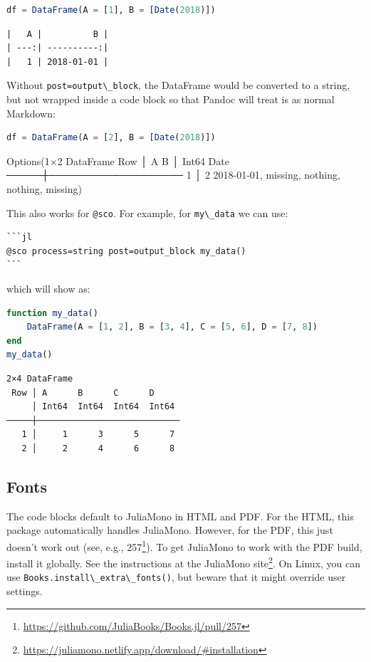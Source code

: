 \documentclass[
  notoc %
]{tufte-book}
\DeclareRobustCommand{\href}[2]{#2\footnote{\url{#1}}}
\newcommand{\passthrough}[1]{#1}
\begin{document}
\begin{lstlisting}[language=Julia]
df = DataFrame(A = [1], B = [Date(2018)])
\end{lstlisting}

\begin{lstlisting}[language=Output]
|   A |          B |
| ---:| ----------:|
|   1 | 2018-01-01 |

\end{lstlisting}

Without \passthrough{\lstinline!post=output\_block!}, the DataFrame
would be converted to a string, but not wrapped inside a code block so
that Pandoc will treat is as normal Markdown:

\begin{lstlisting}[language=Julia]
df = DataFrame(A = [2], B = [Date(2018)])
\end{lstlisting}

Options(1×2 DataFrame Row │ A B │ Int64 Date ─────┼─────────────────── 1
│ 2 2018-01-01, missing, nothing, nothing, missing)

This also works for \passthrough{\lstinline!@sco!}. For example, for
\passthrough{\lstinline!my\_data!} we can use:

\begin{lstlisting}
```jl
@sco process=string post=output_block my_data()
```
\end{lstlisting}

which will show as:

\begin{lstlisting}[language=Julia]
function my_data()
    DataFrame(A = [1, 2], B = [3, 4], C = [5, 6], D = [7, 8])
end
my_data()
\end{lstlisting}

\begin{lstlisting}[language=Output]
2×4 DataFrame
 Row │ A      B      C      D
     │ Int64  Int64  Int64  Int64
─────┼────────────────────────────
   1 │     1      3      5      7
   2 │     2      4      6      8
\end{lstlisting}

\hypertarget{fonts}{%
\subsection{Fonts}\label{fonts}}

The code blocks default to JuliaMono in HTML and PDF. For the HTML, this
package automatically handles JuliaMono. However, for the PDF, this just
doesn't work out (see, e.g.,
\href{https://github.com/JuliaBooks/Books.jl/pull/257}{257}). To get
JuliaMono to work with the PDF build, install it globally. See the
instructions at the
\href{https://juliamono.netlify.app/download/\#installation}{JuliaMono
site}. On Linux, you can use
\passthrough{\lstinline!Books.install\_extra\_fonts()!}, but beware that
it might override user settings.
\end{document}
